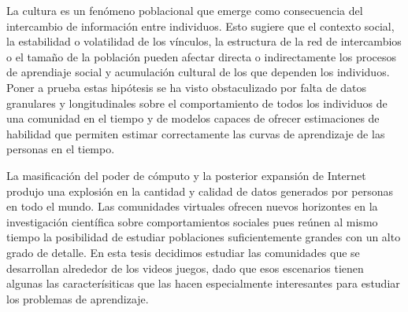 \documentclass[a4paper,10pt]{book}
\theoremstyle{definition}
\begin{document}



%
La cultura es un fenómeno poblacional que emerge como consecuencia del intercambio de información entre individuos.
%
Esto sugiere que el contexto social, la estabilidad o volatilidad de los vínculos, la estructura de la red de intercambios o el tamaño de la población pueden afectar directa o indirectamente los procesos de aprendiaje social y acumulación cultural de los que dependen los individuos.
%
Poner a prueba estas hipótesis se ha visto obstaculizado por falta de datos granulares y longitudinales sobre el comportamiento de todos los individuos de una comunidad en el tiempo y de modelos capaces de ofrecer estimaciones de habilidad que permiten estimar correctamente las curvas de aprendizaje de las personas en el tiempo.



La masificación del poder de cómputo y la posterior expansión de Internet produjo una explosión en la cantidad y calidad de datos generados por personas en todo el mundo.
%
Las comunidades virtuales ofrecen nuevos horizontes en la investigación científica sobre comportamientos sociales pues reúnen al mismo tiempo la posibilidad de estudiar poblaciones suficientemente grandes con un alto grado de detalle.
%
En esta tesis decidimos estudiar las comunidades que se desarrollan alrededor de los videos juegos, dado que esos escenarios tienen algunas las caracterísiticas que las hacen especialmente interesantes para estudiar los problemas de aprendizaje.
\end{document}
